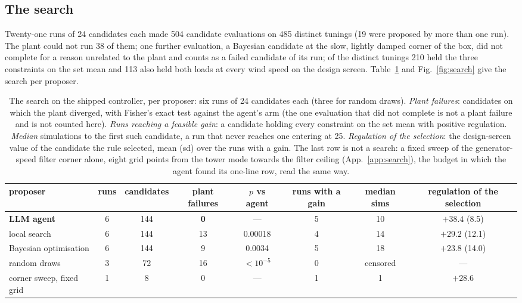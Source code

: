 \documentclass{article}
\begin{document}
\subsection{The search}
\label{sec:search}
Twenty-one runs of 24 candidates each made 504 candidate evaluations on 485 distinct tunings (19 were proposed by more than one run). The plant could not run 38 of them; one further evaluation, a Bayesian candidate at the slow, lightly damped corner of the box, did not complete for a reason unrelated to the plant and counts as a failed candidate of its run; of the distinct tunings 210 held the three constraints on the set mean and 113 also held both loads at every wind speed on the design screen. Table~\ref{tab:search} and Fig.~\ref{fig:search} give the search per proposer.

\begin{table}[t]
\centering\small
\caption{The search on the shipped controller, per proposer: six runs of 24 candidates each (three for random draws). \emph{Plant failures}: candidates on which the plant diverged, with Fisher's exact test against the agent's arm (the one evaluation that did not complete is not a plant failure and is not counted here). \emph{Runs reaching a feasible gain}: a candidate holding every constraint on the set mean with positive regulation. \emph{Median} simulations to the first such candidate, a run that never reaches one entering at 25. \emph{Regulation of the selection}: the design-screen value of the candidate the rule selected, mean (sd) over the runs with a gain. The last row is not a search: a fixed sweep of the generator-speed filter corner alone, eight grid points from the tower mode towards the filter ceiling (App.~\ref{app:search}), the budget in which the agent found its one-line row, read the same way.}
\label{tab:search}
\begin{tabular}{lccccccc}
\toprule
proposer & runs & candidates & plant failures & $p$ vs agent & runs with a gain & median sims & regulation of the selection \\
\midrule
\textbf{LLM agent} & 6 & 144 & \textbf{0} & --- & 5 & 10 & $+38.4$ (8.5) \\
local search & 6 & 144 & 13 & 0.00018 & 4 & 14 & $+29.2$ (12.1) \\
Bayesian optimisation & 6 & 144 & 9 & 0.0034 & 5 & 18 & $+23.8$ (14.0) \\
random draws & 3 & 72 & 16 & $<10^{-5}$ & 0 & censored & --- \\
\midrule
corner sweep, fixed grid & 1 & 8 & 0 & --- & 1 & 1 & $+28.6$ \\
\bottomrule
\end{tabular}
\end{table}
\end{document}
